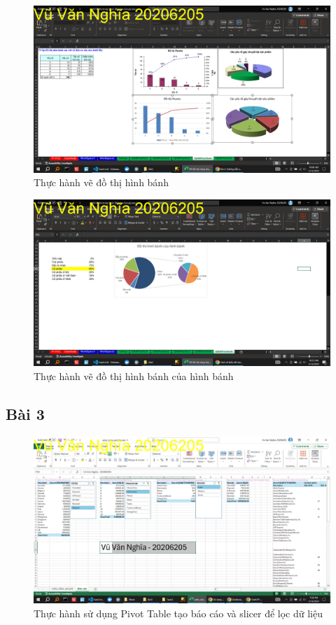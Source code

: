 \documentclass{article}
\begin{document}
\begin{figure}[H]
\centering
\includegraphics[scale = 0.15]{Bai2/ThucHanh/2.png}
\caption{Thực hành vẽ đồ thị hình bánh}
\end{figure}

\begin{figure}[H]
\centering
\includegraphics[scale = 0.15]{Bai2/ThucHanh/3.png}
\caption{Thực hành vẽ đồ thị hình bánh của hình bánh}
\end{figure}

\subsection{Bài 3}

\begin{figure}[H]
\centering
\includegraphics[scale = 0.15]{Bai3/ThucHanh/0.png}
\caption{Thực hành sử dụng Pivot Table tạo báo cáo và slicer để lọc dữ liệu}
\end{figure}

\end{document}
